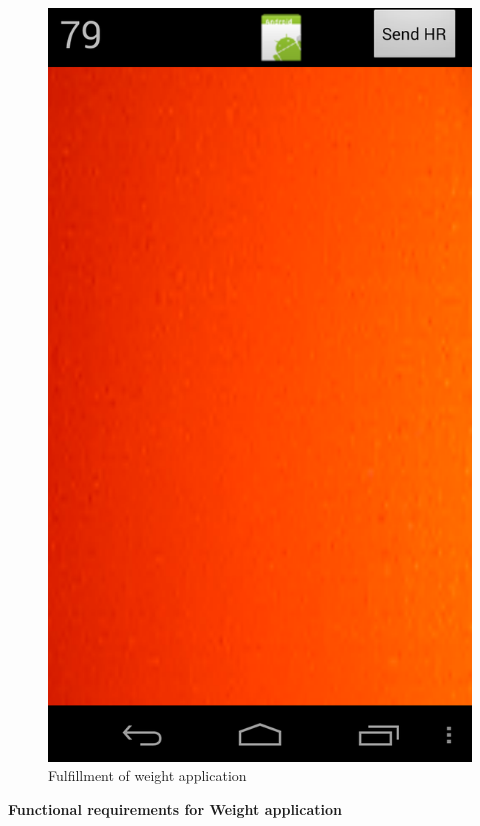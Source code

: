 \begin{figure}[H]
\centering
\includegraphics[scale=0.20]{../Figures/weightappfinal.png}
\caption{Fulfillment of weight application}
\label{figure:weightappfinal}
\end{figure}

\textbf{Functional requirements for Weight application}

